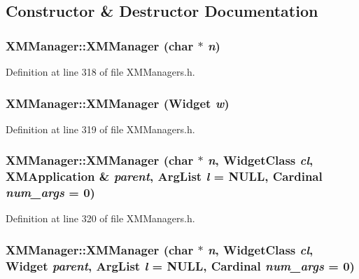 \subsection{Constructor \& Destructor Documentation}
\subsubsection{\setlength{\rightskip}{0pt plus 5cm}XMManager::XMManager (char $\ast$ {\em n})\hspace{0.3cm}{\tt  [inline]}}\label{classXMManager_a0}




Definition at line 318 of file XMManagers.h.
\subsubsection{\setlength{\rightskip}{0pt plus 5cm}XMManager::XMManager (Widget {\em w})\hspace{0.3cm}{\tt  [inline]}}\label{classXMManager_a1}




Definition at line 319 of file XMManagers.h.
\subsubsection{\setlength{\rightskip}{0pt plus 5cm}XMManager::XMManager (char $\ast$ {\em n}, Widget\-Class {\em cl}, {\bf XMApplication} \& {\em parent}, Arg\-List {\em l} = NULL, Cardinal {\em num\_\-args} = 0)\hspace{0.3cm}{\tt  [inline]}}\label{classXMManager_a2}




Definition at line 320 of file XMManagers.h.
\subsubsection{\setlength{\rightskip}{0pt plus 5cm}XMManager::XMManager (char $\ast$ {\em n}, Widget\-Class {\em cl}, Widget {\em parent}, Arg\-List {\em l} = NULL, Cardinal {\em num\_\-args} = 0)\hspace{0.3cm}{\tt  [inline]}}\label{classXMManager_a3}




